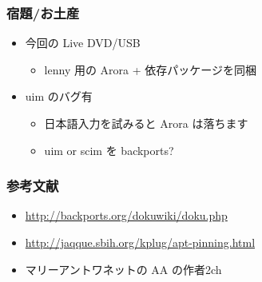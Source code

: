 \documentclass[cjk,dvipdfmx,12pt,%
hyperref={bookmarks=true,bookmarksnumbered=true,bookmarksopen=false,%
colorlinks=false,%
pdftitle={野良ビルドから始めるパッケージ作成},%
pdfauthor={佐々木洋平},%
pdfsubject={第37回関西Debian勉強会 at OSC 2010 Kansai$@$kyoto},%
}]{beamer}
\begin{document}


\begin{frame}[fragile]
\frametitle{宿題/お土産}


\begin{itemize}
\item 今回の Live DVD/USB

\begin{itemize}
\item lenny 用の Arora + 依存パッケージを同梱
\end{itemize}

\item uim のバグ有

\begin{itemize}
\item 日本語入力を試みると Arora は落ちます
\item uim or scim を backports?
\end{itemize}
\end{itemize}

\end{frame}


\begin{frame}[fragile]
\frametitle{参考文献}

\begin{itemize}
\item \url{http://backports.org/dokuwiki/doku.php}
\item \url{http://jaqque.sbih.org/kplug/apt-pinning.html}
\item マリーアントワネットの AA の作者\@2ch
\end{itemize}

\end{frame}


\takahashi[50]{　}
\end{document}
